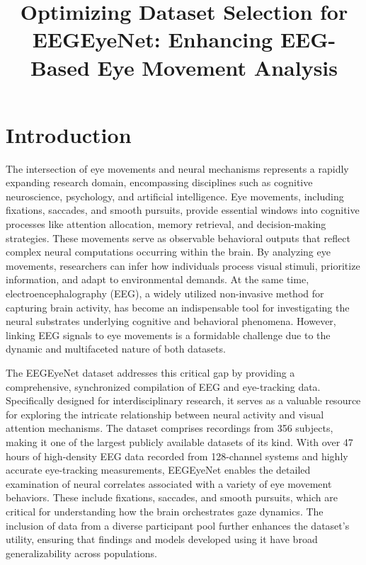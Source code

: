 \documentclass{article}
\title{Optimizing Dataset Selection for EEGEyeNet: Enhancing EEG-Based Eye Movement Analysis}
\begin{document}
\maketitle



\section{Introduction}
The intersection of eye movements and neural mechanisms represents a rapidly expanding research domain, encompassing disciplines such as cognitive neuroscience, psychology, and artificial intelligence. Eye movements, including fixations, saccades, and smooth pursuits, provide essential windows into cognitive processes like attention allocation, memory retrieval, and decision-making strategies. These movements serve as observable behavioral outputs that reflect complex neural computations occurring within the brain. By analyzing eye movements, researchers can infer how individuals process visual stimuli, prioritize information, and adapt to environmental demands. At the same time, electroencephalography (EEG), a widely utilized non-invasive method for capturing brain activity, has become an indispensable tool for investigating the neural substrates underlying cognitive and behavioral phenomena. However, linking EEG signals to eye movements is a formidable challenge due to the dynamic and multifaceted nature of both datasets.

The EEGEyeNet dataset addresses this critical gap by providing a comprehensive, synchronized compilation of EEG and eye-tracking data. Specifically designed for interdisciplinary research, it serves as a valuable resource for exploring the intricate relationship between neural activity and visual attention mechanisms. The dataset comprises recordings from 356 subjects, making it one of the largest publicly available datasets of its kind. With over 47 hours of high-density EEG data recorded from 128-channel systems and highly accurate eye-tracking measurements, EEGEyeNet enables the detailed examination of neural correlates associated with a variety of eye movement behaviors. These include fixations, saccades, and smooth pursuits, which are critical for understanding how the brain orchestrates gaze dynamics. The inclusion of data from a diverse participant pool further enhances the dataset’s utility, ensuring that findings and models developed using it have broad generalizability across populations.
\end{document}
